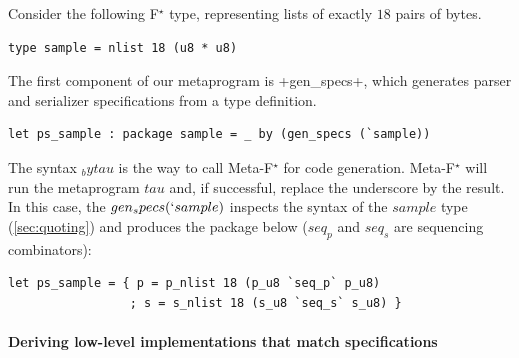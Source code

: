 \documentclass[runningheads]{llncs}
\newcommand\fstar{F$^\star$\xspace}
\newcommand\metafstar{Meta-F$^\star$\xspace}
\newcommand{\comm}[3]{\ifcheckpagebudget\else\ifdraft{{\color{#1}[#2: #3]}}\fi\fi}
\newcommand{\nik}[1]{\comm{dkpurple}{Nik}{#1}}
\newcommand{\guido}[1]{\comm{blue}{Guido}{#1}}
\newcommand{\tahina}[1]{\comm{dkred}{Tahina}{#1}}
\begin{document}
Consider the following \fstar type,
representing lists of exactly $18$ pairs of bytes.
%
\begin{lstlisting}
type sample = nlist 18 (u8 * u8)
\end{lstlisting}
%
%
The first component of our metaprogram is \ls+gen_specs+, which
generates parser and serializer specifications from a type definition.
%
%
\begin{lstlisting}
let ps_sample : package sample = _ by (gen_specs (`sample))
\end{lstlisting}
%
The syntax \ls$_ by tau$ is the way to call \metafstar for code
generation. \metafstar will run the metaprogram \ls$tau$ and, if
successful, replace the underscore by the result.
%
In this case, the \ls$gen_specs (`sample)$ inspects the syntax of
the \ls$sample$ type (\autoref{sec:quoting})
and produces the package below (\ls$seq_p$ and \ls$seq_s$ are 
sequencing combinators):
%
\begin{lstlisting}
let ps_sample = { p = p_nlist 18 (p_u8 `seq_p` p_u8)
                 ; s = s_nlist 18 (s_u8 `seq_s` s_u8) }
\end{lstlisting}
%
%
\paragraph{Deriving low-level implementations that match specifications}
\end{document}
